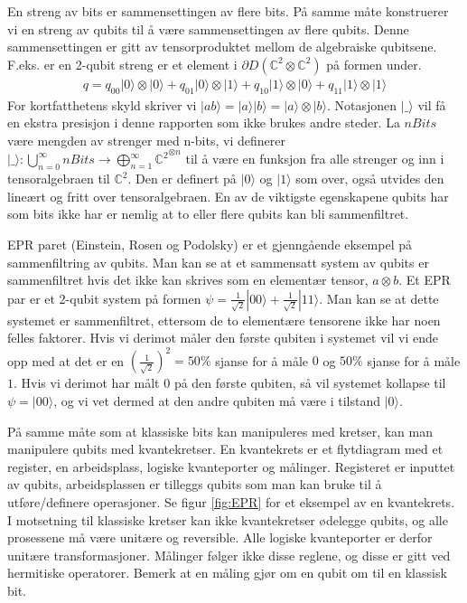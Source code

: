         En streng av bits er sammensettingen av flere bits. På samme måte konstruerer vi en streng av qubits til å være sammensettingen av flere qubits. Denne sammensettingen er gitt av tensorproduktet mellom de algebraiske qubitsene. F.eks. er en 2-qubit streng er et element i $\partial D(\mathbb{C}^2\otimes\mathbb{C}^2)$ på formen under.
        \begin{align*}
            q = q_{00}|0\rangle\otimes |0\rangle + q_{01}|0\rangle\otimes |1\rangle + q_{10}|1\rangle\otimes|0\rangle + q_{11}|1\rangle\otimes |1\rangle
        \end{align*}
        For kortfatthetens skyld skriver vi $|ab\rangle = |a\rangle|b\rangle = |a\rangle\otimes |b\rangle$. Notasjonen $|\_\rangle$ vil få en ekstra presisjon i denne rapporten som ikke brukes andre steder. La $nBits$ være mengden av strenger med n-bits, vi definerer $|\_\rangle : \bigcup_{n=0}^{\infty}nBits \rightarrow \bigoplus_{n=1}^{\infty}{\mathbb{C}^2}^{\otimes n}$ til å være en funksjon fra alle strenger og inn i tensoralgebraen til $\mathbb{C}^2$. Den er definert på $|0\rangle$ og $|1\rangle$ som over, også utvides den lineært og fritt over tensoralgebraen. En av de viktigste egenskapene qubits har som bits ikke har er nemlig at to eller flere qubits kan bli sammenfiltret.

        EPR paret (Einstein, Rosen og Podolsky) er et gjenngående eksempel på sammenfiltring av qubits. Man kan se at et sammensatt system av qubits er sammenfiltret hvis det ikke kan skrives som en elementær tensor, $a\otimes b$. Et EPR par er et 2-qubit system på formen $\psi = \frac{1}{\sqrt{2}}|00\rangle + \frac{1}{\sqrt{2}}|11\rangle$. Man kan se at dette systemet er sammenfiltret, ettersom de to elementære tensorene ikke har noen felles faktorer. Hvis vi derimot måler den første qubiten i systemet vil vi ende opp med at det er en $(\frac{1}{\sqrt{2}})^2 = 50\%$ sjanse for å måle $0$ og $50\%$ sjanse for å måle $1$. Hvis vi derimot har målt $0$ på den første qubiten, så vil systemet kollapse til $\psi = |00\rangle$, og vi vet dermed at den andre qubiten må være i tilstand $|0\rangle$.

        På samme måte som at klassiske bits kan manipuleres med kretser, kan man manipulere qubits med kvantekretser. En kvantekrets er et flytdiagram med et register, en arbeidsplass, logiske kvanteporter og målinger. Registeret er inputtet av qubits, arbeidsplassen er tilleggs qubits som man kan bruke til å utføre/definere operasjoner. Se figur \ref{fig:EPR} for et eksempel av en kvantekrets. I motsetning til klassiske kretser kan ikke kvantekretser ødelegge qubits, og alle prosessene må være unitære og reversible. Alle logiske kvanteporter er derfor unitære transformasjoner. Målinger følger ikke disse reglene, og disse er gitt ved hermitiske operatorer. Bemerk at en måling gjør om en qubit om til en klassisk bit.

